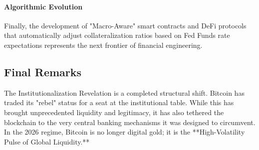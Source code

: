 \documentclass[10pt, conference, compsocconf]{IEEEtran}
\begin{document}
\paragraph{Algorithmic Evolution}
Finally, the development of "Macro-Aware" smart contracts and DeFi protocols that automatically adjust collateralization ratios based on Fed Funds rate expectations represents the next frontier of financial engineering. 

\subsection{Final Remarks}
The Institutionalization Revelation is a completed structural shift. Bitcoin has traded its "rebel" status for a seat at the institutional table. While this has brought unprecedented liquidity and legitimacy, it has also tethered the blockchain to the very central banking mechanisms it was designed to circumvent. In the 2026 regime, Bitcoin is no longer digital gold; it is the **High-Volatility Pulse of Global Liquidity.**



\end{document}
